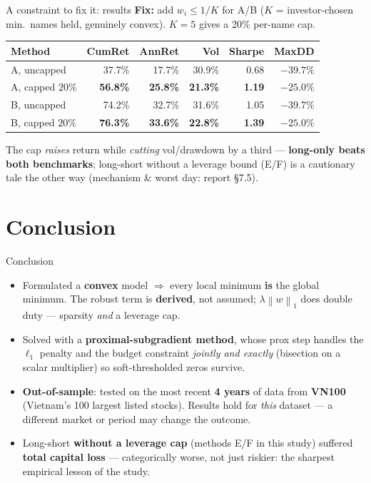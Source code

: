 \documentclass[aspectratio=169]{beamer}
\newcommand{\norm}[1]{\left\lVert #1 \right\rVert}
\newcommand{\good}[1]{\textcolor{green!45!black}{\textbf{#1}}}
\begin{document}
\begin{frame}{A constraint to fix it: results}
  \textbf{Fix:} add $w_i \le 1/K$ for A/B ($K$ = investor-chosen min.\ names held, genuinely
  convex). $K=5$ gives a 20\% per-name cap.
  \vspace{0.2cm}
  \small
  \begin{table}
  \begin{tabular}{@{}lrrrrr@{}}
  \toprule
  \textbf{Method} & CumRet & AnnRet & Vol & Sharpe & MaxDD \\
  \midrule
  A, uncapped      & 37.7\% & 17.7\% & 30.9\% & 0.68 & $-39.7\%$ \\
  A, capped $20\%$ & \good{56.8\%} & \good{25.8\%} & \good{21.3\%} & \good{1.19} & \good{$-25.0\%$} \\
  B, uncapped      & 74.2\% & 32.7\% & 31.6\% & 1.05 & $-39.7\%$ \\
  B, capped $20\%$ & \good{76.3\%} & \good{33.6\%} & \good{22.8\%} & \good{1.39} & \good{$-25.0\%$} \\
  \bottomrule
  \end{tabular}
  \end{table}
  \small The cap \emph{raises} return while \emph{cutting} vol/drawdown by a third ---
  \good{long-only beats both benchmarks}; long-short without a leverage bound (E/F) is a
  cautionary tale the other way (mechanism \& worst day: report \S7.5).
\end{frame}

\section{Conclusion}

\begin{frame}{Conclusion}
  \begin{itemize}
    \item Formulated a \textbf{convex} model $\Rightarrow$ every local minimum \textbf{is} the
          global minimum. The robust term is \textbf{derived}, not assumed; $\lambda\norm{w}_1$
          does double duty --- sparsity \emph{and} a leverage cap.
    \item Solved with a \textbf{proximal-subgradient method}, whose prox step handles the
          $\ell_1$ penalty and the budget constraint \emph{jointly and exactly} (bisection on a
          scalar multiplier) so soft-thresholded zeros survive.
    \item \textbf{Out-of-sample}: tested on the most recent \textbf{4 years} of data from
          \textbf{VN100} (Vietnam's 100 largest listed stocks). Results hold for \emph{this}
          dataset --- a different market or period may change the outcome.
    \item Long-short \textbf{without a leverage cap} (methods E/F in this study) suffered
          \textbf{total capital loss} --- categorically worse, not just riskier: the sharpest
          empirical lesson of the study.
  \end{itemize}
\end{frame}
\end{document}
